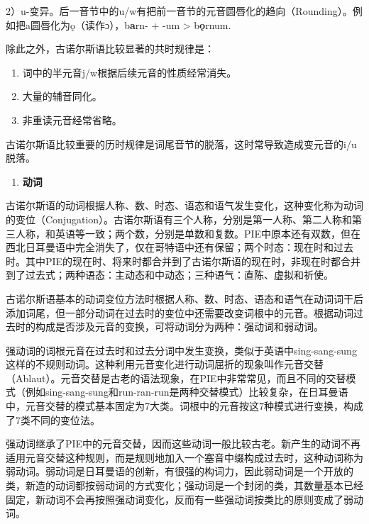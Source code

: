 2）u-变异。后一音节中的u/w有把前一音节的元音圆唇化的趋向（Rounding）。例如把a圆唇化为ǫ（读作ɔ），b\textbf{a}rn-
+ -um \textgreater{} b\textbf{ǫ}rnum.

除此之外，古诺尔斯语比较显著的共时规律是：

\begin{enumerate}
  \def\labelenumi{\arabic{enumi}.}
  \item
        词中的半元音j/w根据后续元音的性质经常消失。
  \item
        大量的辅音同化。
  \item
        非重读元音经常省略。
\end{enumerate}

古诺尔斯语比较重要的历时规律是词尾音节的脱落，这时常导致造成变元音的i/u脱落。

\begin{enumerate}
  \def\labelenumi{\Alph{enumi}.}
  \setcounter{enumi}{1}
  \item
        \textbf{动词}
\end{enumerate}

古诺尔斯语的动词根据人称、数、时态、语态和语气发生变化，这种变化称为动词的变位（Conjugation）。古诺尔斯语有三个人称，分别是第一人称、第二人称和第三人称，和英语等一致；两个数，分别是单数和复数。PIE中原本还有双数，但在西北日耳曼语中完全消失了，仅在哥特语中还有保留；两个时态：现在时和过去时。其中PIE的现在时、将来时都合并到了古诺尔斯语的现在时，非现在时都合并到了过去式；两种语态：主动态和中动态；三种语气：直陈、虚拟和祈使。

古诺尔斯语基本的动词变位方法时根据人称、数、时态、语态和语气在动词词干后添加词尾，但一部分动词在过去时的变位中还需要改变词根中的元音。根据动词过去时的构成是否涉及元音的变换，可将动词分为两种：强动词和弱动词。

强动词的词根元音在过去时和过去分词中发生变换，类似于英语中sing-sang-sung这样的不规则动词。这种利用元音变化进行动词屈折的现象叫作元音交替（Ablaut）。元音交替是古老的语法现象，在PIE中非常常见，而且不同的交替模式（例如sing-sang-sung和run-ran-run是两种交替模式）比较复杂，在日耳曼语中，元音交替的模式基本固定为7大类。词根中的元音按这7种模式进行变换，构成了7类不同的变位法。

强动词继承了PIE中的元音交替，因而这些动词一般比较古老。新产生的动词不再适用元音交替这种规则，而是规则地加入一个塞音中缀构成过去时，这种动词称为弱动词。弱动词是日耳曼语的创新，有很强的构词力，因此弱动词是一个开放的类，新造的动词都按弱动词的方式变化；强动词是一个封闭的类，其数量基本已经固定，新动词不会再按照强动词变化，反而有一些强动词按类比的原则变成了弱动词。

